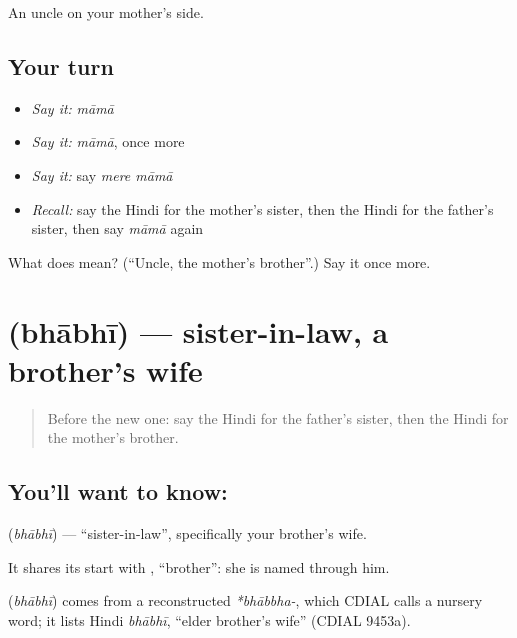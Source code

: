 \begin{grammarlens}[title={What you've built}]
An uncle on your mother's side.
\end{grammarlens}

\subsection*{Your turn}
\begin{itemize}
\raggedright
  \item \emph{Say it:} \emph{māmā}
  \item \emph{Say it:} \emph{māmā}, once more
  \item \emph{Say it:} say \emph{mere māmā}
  \item \emph{Recall:} say the Hindi for the mother's sister, then the Hindi for the father's sister, then say \emph{māmā} again
\end{itemize}

\begin{tcolorbox}[breakable,colback=teal!4,colframe=teal!35!black,title={Before you move on}]
What does  mean? (\textquotedblleft{}Uncle, the mother's brother\textquotedblright{}.) Say it once more.
\end{tcolorbox}
\section[\texorpdfstring{\hi{भाभी} (bhābhī)}{भाभी (bhābhī)}]{ (bhābhī) — sister-in-law, a brother's wife}

\label{lesson:HI-C117-bhabhi}



\begin{quote}
Before the new one: say the Hindi for the father's sister, then the Hindi for the mother's brother.
\end{quote}

\subsection*{You'll want to know: }
\textbf{} (\emph{bhābhī}) — \textquotedblleft{}sister-in-law\textquotedblright{}, specifically your brother's wife.

It shares its start with \textbf{}, \textquotedblleft{}brother\textquotedblright{}: she is named through him.

\begin{cousinweb}
\textbf{} (\emph{bhābhī}) comes from a reconstructed \emph{*bhābbha-}, which CDIAL calls a nursery word; it lists Hindi \emph{bhābhī}, \textquotedblleft{}elder brother's wife\textquotedblright{} (CDIAL 9453a).
\end{cousinweb}

